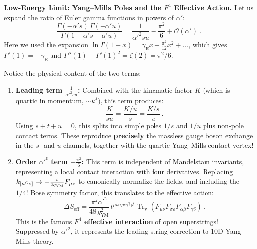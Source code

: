 \begin{tcolorbox}[breakable]
	\begin{remark}
		\textbf{Low-Energy Limit: Yang--Mills Poles and the $F^{4}$ Effective Action.}
		Let us expand the ratio of Euler gamma functions in powers of $\alpha'$:
		\begin{equation}
			\frac{\Gamma(-\alpha's)\,\Gamma(-\alpha'u)}{\Gamma(1-\alpha's-\alpha'u)} = \frac{1}{\alpha'^{2}su} - \frac{\pi^{2}}{6} + \mathcal{O}(\alpha') \:. \label{12.4.27}
		\end{equation}
		Here we used the expansion $\ln\Gamma(1-x) = \gamma_{\mathrm{E}}x + \frac{\pi^{2}}{12}x^{2} + \dots$, which gives $\Gamma'(1) = -\gamma_{\mathrm{E}}$ and $\Gamma''(1) - \Gamma'(1)^{2} = \zeta(2) = \pi^{2}/6$.
		
		Notice the physical content of the two terms:
		\begin{enumerate}
			\item \textbf{Leading term $\frac{1}{\alpha'^{2}su}$:} Combined with the kinematic factor $K$ (which is quartic in momentum, $\sim k^{4}$), this term produces:
			\[
			\frac{K}{su} = \frac{K/u}{s} = \frac{K/s}{u} \:.
			\]
			Using $s+t+u=0$, this splits into simple poles $1/s$ and $1/u$ plus non-pole contact terms. These reproduce \textbf{precisely} the massless gauge boson exchange in the $s$- and $u$-channels, together with the quartic Yang--Mills contact vertex!
			
			\item \textbf{Order $\alpha'^{0}$ term $-\frac{\pi^{2}}{6}$:} This term is independent of Mandelstam invariants, representing a local contact interaction with four derivatives. Replacing $k_{[\mu}e_{\nu]} \to -\frac{i}{2g_{\mathrm{YM}}}F_{\mu\nu}$ to canonically normalize the fields, and including the $1/4!$ Bose symmetry factor, this translates to the effective action:
			\begin{equation}
				\Delta S_{\mathrm{eff}} = \frac{\pi^{2}\alpha'^{2}}{48\,g_{\mathrm{YM}}^{2}}\,t^{\mu\nu\sigma\rho\alpha\beta\gamma\delta}\operatorname{Tr}_{\mathrm{v}}(F_{\mu\nu}F_{\sigma\rho}F_{\alpha\beta}F_{\gamma\delta}) \:. \label{12.4.28}
			\end{equation}
			This is the famous \textbf{$F^{4}$ effective interaction} of open superstrings! Suppressed by $\alpha'^{2}$, it represents the leading string correction to 10D Yang--Mills theory.
		\end{enumerate}
	\end{remark}
\end{tcolorbox}

